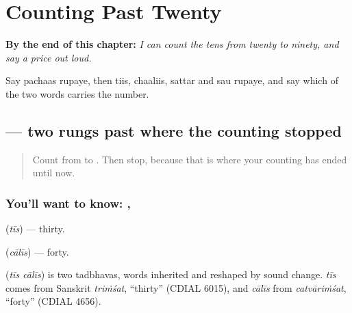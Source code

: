 
\chapter{Counting Past Twenty}
\label{ch:hi-ginti}

\begin{chapteropening}
\textbf{By the end of this chapter:} \emph{I can count the tens from twenty to ninety, and say a price out loud.}

Say pachaas rupaye, then tiis, chaaliis, sattar and sau rupaye, and say which of the two words carries the number.
\end{chapteropening}

\section[\texorpdfstring{\hi{तीस} \hi{चालीस} (tīs cālīs)}{तीस चालीस (tīs cālīs)}]{  — two rungs past where the counting stopped}

\label{lesson:HI-C96-tees-chaalees}



\begin{quote}
Count from \textbf{} to \textbf{}. Then stop, because that is where your counting has ended until now.
\end{quote}

\subsection*{You'll want to know: , }
\textbf{} (\emph{tīs}) — thirty.

\textbf{} (\emph{cālīs}) — forty.

\begin{cousinweb}
\textbf{ } (\emph{tīs cālīs}) is two tadbhavas, words inherited and reshaped by sound change. \emph{tīs} comes from Sanskrit \emph{triṁśat}, \textquotedblleft{}thirty\textquotedblright{} (CDIAL 6015), and \emph{cālīs} from \emph{catvāriṁśat}, \textquotedblleft{}forty\textquotedblright{} (CDIAL 4656).
\end{cousinweb}

